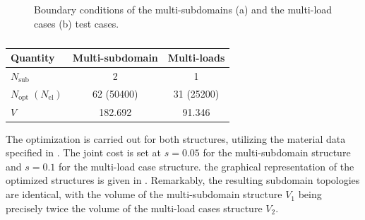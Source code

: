 \begin{figure}[]
    \hspace*{\fill}
    \hfill
    \hspace*{\fill}
    \caption{Boundary conditions of the multi-subdomains (a) and the multi-load cases (b) test cases.}
    \label{fig:05_cell_multi_eq_bcs}
\end{figure}

\begin{table}
    \centering
    \small
    \begin{tabular}{lcc}
        \toprule
        \textbf{Quantity} & Multi-subdomain & Multi-loads \\ \midrule
    $N_\text{sub}$       &2& 1   \\
    $N_\text{opt}\;(N_\text{el})$ & 62 (50400)&31 (25200)  \\
    $V$ &  182.692 & 91.346 \\ \bottomrule
    \end{tabular}
    \caption{}
    \label{tab:05_}
    \end{table}

The optimization is carried out for both structures, utilizing the material data specified in . The joint cost is set at $s = 0.05$ for the multi-subdomain structure and $s = 0.1$ for the multi-load case structure. the graphical representation of the optimized structures is given in . Remarkably, the resulting subdomain topologies are identical, with the volume of the multi-subdomain structure $V_1$ being precisely twice the volume of the multi-load cases structure $V_2$. 

